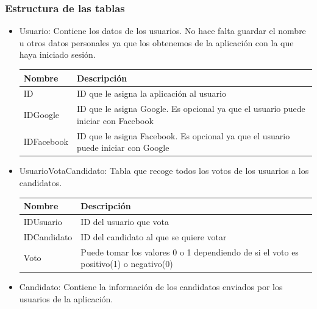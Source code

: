 \subsubsection{Estructura de las tablas}

\begin{itemize}
\item Usuario: Contiene los datos de los usuarios. No hace falta guardar el nombre u otros datos personales ya que los obtenemos de la aplicación con la que haya iniciado sesión.


\begin{tabularx}{15cm}{|l|X|}
\hline
\textbf{Nombre} & \textbf{Descripción}                                                              \\ \hline
ID              & ID que le asigna la aplicación al usuario                                         \\ \hline
IDGoogle        & ID que le asigna Google. Es opcional ya que el usuario puede iniciar con Facebook \\ \hline
IDFacebook      & ID que le asigna Facebook. Es opcional ya que el usuario puede iniciar con Google \\ \hline
\end{tabularx}
\vspace{1em}

\item UsuarioVotaCandidato: Tabla que recoge todos los votos de los usuarios a los candidatos.

\begin{tabularx}{15cm}{|l|X|}
\hline
\textbf{Nombre} & \textbf{Descripción}                                                              \\ \hline
IDUsuario       & ID del usuario que vota                                                           \\ \hline
IDCandidato     & ID del candidato al que se quiere votar                                           \\ \hline
Voto            & Puede tomar los valores 0 o 1 dependiendo de si el voto es positivo(1) o negativo(0) \\ \hline
\end{tabularx}
\vspace{1em}

\item Candidato: Contiene la información de los candidatos enviados por los usuarios de la aplicación.


\end{itemize}
